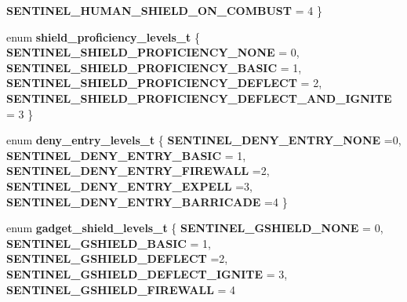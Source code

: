 \begin{DoxyCompactItemize}
{\bfseries S\+E\+N\+T\+I\+N\+E\+L\+\_\+\+H\+U\+M\+A\+N\+\_\+\+S\+H\+I\+E\+L\+D\+\_\+\+O\+N\+\_\+\+C\+O\+M\+B\+U\+ST} = 4
 \}
\item 
\mbox{\label{structmods_1_1classes_1_1sentinel_acf9e023c7b13a7d1a693d14104f96001}} 
enum {\bfseries shield\+\_\+proficiency\+\_\+levels\+\_\+t} \{ {\bfseries S\+E\+N\+T\+I\+N\+E\+L\+\_\+\+S\+H\+I\+E\+L\+D\+\_\+\+P\+R\+O\+F\+I\+C\+I\+E\+N\+C\+Y\+\_\+\+N\+O\+NE} = 0, 
{\bfseries S\+E\+N\+T\+I\+N\+E\+L\+\_\+\+S\+H\+I\+E\+L\+D\+\_\+\+P\+R\+O\+F\+I\+C\+I\+E\+N\+C\+Y\+\_\+\+B\+A\+S\+IC} = 1, 
{\bfseries S\+E\+N\+T\+I\+N\+E\+L\+\_\+\+S\+H\+I\+E\+L\+D\+\_\+\+P\+R\+O\+F\+I\+C\+I\+E\+N\+C\+Y\+\_\+\+D\+E\+F\+L\+E\+CT} = 2, 
{\bfseries S\+E\+N\+T\+I\+N\+E\+L\+\_\+\+S\+H\+I\+E\+L\+D\+\_\+\+P\+R\+O\+F\+I\+C\+I\+E\+N\+C\+Y\+\_\+\+D\+E\+F\+L\+E\+C\+T\+\_\+\+A\+N\+D\+\_\+\+I\+G\+N\+I\+TE} = 3
 \}
\item 
\mbox{\label{structmods_1_1classes_1_1sentinel_afa6f7903f26becd7b22f06dea67afe0c}} 
enum {\bfseries deny\+\_\+entry\+\_\+levels\+\_\+t} \{ \newline
{\bfseries S\+E\+N\+T\+I\+N\+E\+L\+\_\+\+D\+E\+N\+Y\+\_\+\+E\+N\+T\+R\+Y\+\_\+\+N\+O\+NE} =0, 
{\bfseries S\+E\+N\+T\+I\+N\+E\+L\+\_\+\+D\+E\+N\+Y\+\_\+\+E\+N\+T\+R\+Y\+\_\+\+B\+A\+S\+IC} = 1, 
{\bfseries S\+E\+N\+T\+I\+N\+E\+L\+\_\+\+D\+E\+N\+Y\+\_\+\+E\+N\+T\+R\+Y\+\_\+\+F\+I\+R\+E\+W\+A\+LL} =2, 
{\bfseries S\+E\+N\+T\+I\+N\+E\+L\+\_\+\+D\+E\+N\+Y\+\_\+\+E\+N\+T\+R\+Y\+\_\+\+E\+X\+P\+E\+LL} =3, 
\newline
{\bfseries S\+E\+N\+T\+I\+N\+E\+L\+\_\+\+D\+E\+N\+Y\+\_\+\+E\+N\+T\+R\+Y\+\_\+\+B\+A\+R\+R\+I\+C\+A\+DE} =4
 \}
\item 
\mbox{\label{structmods_1_1classes_1_1sentinel_a429bf1dba544a00c81b4807cfe5e5875}} 
enum {\bfseries gadget\+\_\+shield\+\_\+levels\+\_\+t} \{ \newline
{\bfseries S\+E\+N\+T\+I\+N\+E\+L\+\_\+\+G\+S\+H\+I\+E\+L\+D\+\_\+\+N\+O\+NE} = 0, 
{\bfseries S\+E\+N\+T\+I\+N\+E\+L\+\_\+\+G\+S\+H\+I\+E\+L\+D\+\_\+\+B\+A\+S\+IC} = 1, 
{\bfseries S\+E\+N\+T\+I\+N\+E\+L\+\_\+\+G\+S\+H\+I\+E\+L\+D\+\_\+\+D\+E\+F\+L\+E\+CT} =2, 
{\bfseries S\+E\+N\+T\+I\+N\+E\+L\+\_\+\+G\+S\+H\+I\+E\+L\+D\+\_\+\+D\+E\+F\+L\+E\+C\+T\+\_\+\+I\+G\+N\+I\+TE} = 3, 
\newline
{\bfseries S\+E\+N\+T\+I\+N\+E\+L\+\_\+\+G\+S\+H\+I\+E\+L\+D\+\_\+\+F\+I\+R\+E\+W\+A\+LL} = 4

\end{DoxyCompactItemize}
